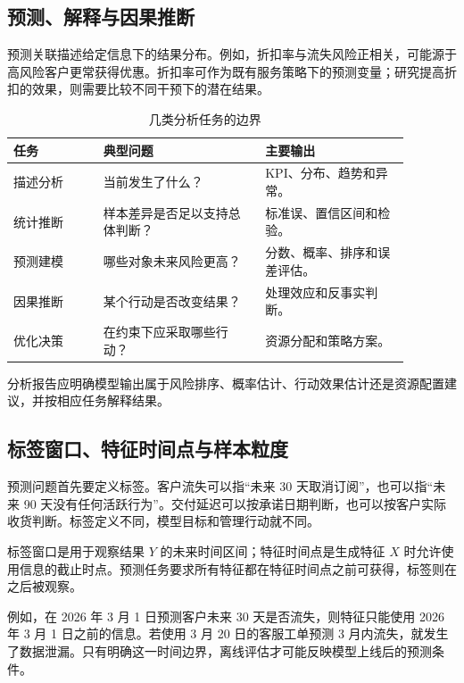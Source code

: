 \subsection{预测、解释与因果推断}

预测关联描述给定信息下的结果分布。例如，折扣率与流失风险正相关，可能源于高风险客户更常获得优惠。折扣率可作为既有服务策略下的预测变量；研究提高折扣的效果，则需要比较不同干预下的潜在结果。

\begin{table}[htbp]
\centering
\caption{几类分析任务的边界}
\begin{tabular}{P{0.20\linewidth}P{0.36\linewidth}P{0.32\linewidth}}
\toprule
{}
任务 & 典型问题 & 主要输出\\
\midrule

描述分析 & 当前发生了什么？ & KPI、分布、趋势和异常。\\
统计推断 & 样本差异是否足以支持总体判断？ & 标准误、置信区间和检验。\\
预测建模 & 哪些对象未来风险更高？ & 分数、概率、排序和误差评估。\\
因果推断 & 某个行动是否改变结果？ & 处理效应和反事实判断。\\
优化决策 & 在约束下应采取哪些行动？ & 资源分配和策略方案。\\
\bottomrule
\end{tabular}
\end{table}

分析报告应明确模型输出属于风险排序、概率估计、行动效果估计还是资源配置建议，并按相应任务解释结果。

\subsection{标签窗口、特征时间点与样本粒度}

预测问题首先要定义标签。客户流失可以指“未来 30 天取消订阅”，也可以指“未来 90 天没有任何活跃行为”。交付延迟可以按承诺日期判断，也可以按客户实际收货判断。标签定义不同，模型目标和管理行动就不同。

\begin{definition}[标签窗口与特征时间点]
标签窗口是用于观察结果 \(Y\) 的未来时间区间；特征时间点是生成特征 \(X\) 时允许使用信息的截止时点。预测任务要求所有特征都在特征时间点之前可获得，标签则在之后被观察。
\end{definition}

例如，在 2026 年 3 月 1 日预测客户未来 30 天是否流失，则特征只能使用 2026 年 3 月 1 日之前的信息。若使用 3 月 20 日的客服工单预测 3 月内流失，就发生了数据泄漏。只有明确这一时间边界，离线评估才可能反映模型上线后的预测条件。

